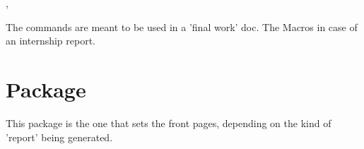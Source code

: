 \documentclass[article,nogeometry,english,tocdepth=3,secdepth=3]{ufrgscca} %
\begin{document}
\begin{codedescribe}{\supervisor,\supervisorinfo}%
\begin{codesyntax}
\end{codesyntax}
\end{codedescribe}

\begin{tsremark}[N.B.:]
The commands \tsobj{\advisor,\coadvisor,\examiner,\altexaminer} are meant to be used in a 'final work' doc. The Macros \tsobj{\internship,\tutor,\supervisor} in case of an internship report.
\end{tsremark}


\section{ Package}
This package is the one that sets the front pages, depending on the kind of 'report' being generated. 

\end{document}
